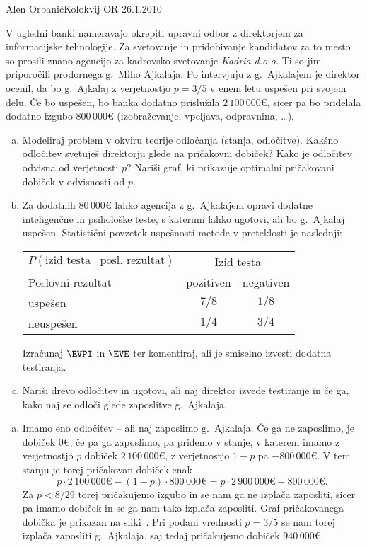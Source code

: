 \begin{naloga}{Alen Orbanić}{Kolokvij OR 26.1.2010}
\begin{vprasanje}
V ugledni banki nameravajo okrepiti upravni odbor
z direktorjem za informacijske tehnologije.
Za svetovanje in pridobivanje kandidatov za to mesto
so prosili znano agencijo za kadrovsko svetovanje {\em Kadria d.o.o.}
Ti so jim priporočili prodornega g.~Miho Ajkalaja.
Po intervjuju z g.~Ajkalajem je direktor ocenil,
da bo g.~Ajkalaj z verjetnostjo $p = 3/5$ v enem letu uspešen pri svojem delu.
Če bo uspešen, bo banka dodatno prislužila $2\,100\,000 €$,
sicer pa bo pridelala dodatno izgubo $800\,000 €$
(izobraževanje, vpeljava, odpravnina, \dots).

\begin{enumerate}[(a)]
\item Modeliraj problem v okviru teorije odločanja (stanja, odločitve).
Kakšno odločitev svetuješ direktorju glede na pričakovni dobiček?
Kako je odločitev odvisna od verjetnosti $p$?
Nariši graf, ki prikazuje optimalni pričakovani dobiček v odvisnosti od $p$.

\item Za dodatnih $80\,000 €$ lahko agencija
z g.~Ajkalajem opravi dodatne inteligenčne in psihološke teste,
s katerimi lahko ugotovi, ali bo g.~Ajkalaj uspešen.
Statistični povzetek uspešnosti metode v preteklosti je naslednji:
\begin{center}
\begin{tabular}{l|cc}
$P(\text{izid testa} \;|\; \text{posl.~rezultat})$ &
\multicolumn{2}{c}{Izid testa} \\
Poslovni rezultat & pozitiven & negativen \\ \hline
uspešen   &  $7/8$ & $1/8$ \\
neuspešen &  $1/4$ & $3/4$
\end{tabular}
\end{center}
Izračunaj $\EVPI$ in $\EVE$ ter komentiraj,
ali je smiselno izvesti dodatna testiranja.

\item Nariši drevo odločitev in ugotovi,
ali naj direktor izvede testiranje in če ga,
kako naj se odloči glede zaposlitve g.~Ajkalaja.
\end{enumerate}
\end{vprasanje}

\begin{odgovor}
\begin{enumerate}[(a)]
\item Imamo eno odločitev -- ali naj zaposlimo g.~Ajkalaja.
Če ga ne zaposlimo, je dobiček $0 €$,
če pa ga zaposlimo, pa pridemo v stanje,
v katerem imamo z verjetnostjo $p$ dobiček $2\,100\,000 €$,
z verjetnostjo $1-p$ pa $-800\,000 €$.
V tem stanju je torej pričakovan dobiček enak
$$
p \cdot 2\,100\,000 € - (1-p) \cdot 800\,000 € =
p \cdot 2\,900\,000 € - 800\,000 € .
$$
Za $p < 8/29$ torej pričakujemo izgubo in se nam ga ne izplača zaposliti,
sicer pa imamo dobiček in se ga nam tako izplača zaposliti.
Graf pričakovanega dobička je prikazan na sliki~.
Pri podani vrednosti $p = 3/5$ se nam torej izplača zaposliti g.~Ajkalaja,
saj tedaj pričakujemo dobiček $940\,000 €$.


\end{enumerate}
\end{odgovor}
\end{naloga}
